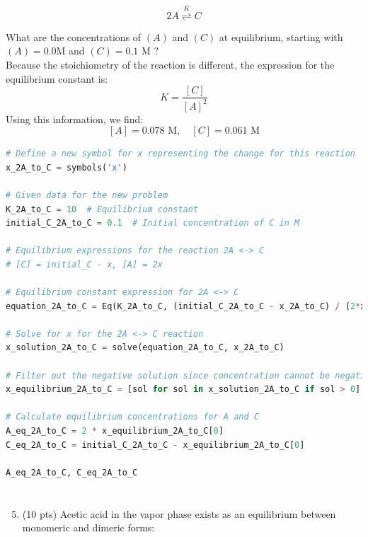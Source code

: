 \documentclass[12 pt]{article}
\begin{document}
$$
2 A \stackrel{K}{\rightleftharpoons} C
$$

What are the concentrations of $(A)$ and $(C)$ at equilibrium, starting with $(A)=0.0 \mathrm{M}$ and $(C)=0.1$ $\mathrm{M}$ ?\\
Because the stoichiometry of the reaction is different, the expression for the equilibrium constant is:
\begin{equation}
  K = \frac{[C]}{[A]^2}
\end{equation}
Using this information, we find:
\begin{equation}
\boxed{[A] = 0.078 \text{ M}, \quad [C] = 0.061 \text{ M}}
\end{equation}
\begin{lstlisting}[language=Python]
# Define a new symbol for x representing the change for this reaction
x_2A_to_C = symbols('x')

# Given data for the new problem
K_2A_to_C = 10  # Equilibrium constant
initial_C_2A_to_C = 0.1  # Initial concentration of C in M

# Equilibrium expressions for the reaction 2A <-> C
# [C] = initial_C - x, [A] = 2x

# Equilibrium constant expression for 2A <-> C
equation_2A_to_C = Eq(K_2A_to_C, (initial_C_2A_to_C - x_2A_to_C) / (2*x_2A_to_C)**2)

# Solve for x for the 2A <-> C reaction
x_solution_2A_to_C = solve(equation_2A_to_C, x_2A_to_C)

# Filter out the negative solution since concentration cannot be negative
x_equilibrium_2A_to_C = [sol for sol in x_solution_2A_to_C if sol > 0]

# Calculate equilibrium concentrations for A and C
A_eq_2A_to_C = 2 * x_equilibrium_2A_to_C[0]
C_eq_2A_to_C = initial_C_2A_to_C - x_equilibrium_2A_to_C[0]

A_eq_2A_to_C, C_eq_2A_to_C

\end{lstlisting}

\section{}
\begin{enumerate}
  \setcounter{enumi}{4}
  \item (10 pts) Acetic acid in the vapor phase exists as an equilibrium between monomeric and dimeric forms:
\end{enumerate}
\end{document}
